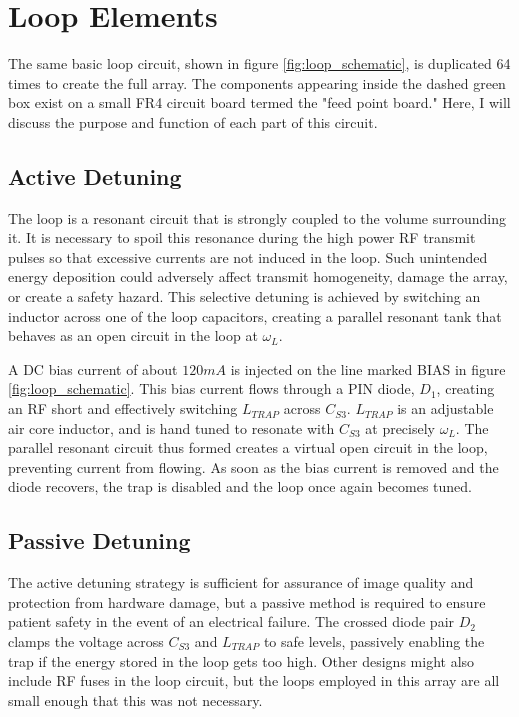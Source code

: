 \chapter{Loop Elements}

The same basic loop circuit, shown in figure \ref{fig:loop_schematic}, is duplicated 64 times to create the full array.
The components appearing inside the dashed green box exist on a small FR4 circuit board termed the "feed point board."
Here, I will discuss the purpose and function of each part of this circuit.

\section{Active Detuning}
The loop is a resonant circuit that is strongly coupled to the volume surrounding it. It is necessary to spoil this
resonance during the high power RF transmit pulses so that excessive currents are not induced in the loop. Such
unintended energy deposition could adversely affect transmit homogeneity, damage the array, or create a safety hazard.
This selective detuning is achieved by switching an inductor across one of the loop capacitors, creating a parallel
resonant tank that behaves as an open circuit in the loop at $\omega_L$.

A DC bias current of about $120mA$ is injected on the line marked BIAS in figure \ref{fig:loop_schematic}. This bias
current flows through a PIN diode, $D_1$, creating an RF short and effectively switching $L_{TRAP}$ across $C_{S3}$.
$L_{TRAP}$ is an adjustable air core inductor, and is hand tuned to resonate with $C_{S3}$ at precisely $\omega_L$. The 
parallel resonant circuit thus formed creates a virtual open circuit in the loop, preventing current from flowing. As 
soon as the bias current is removed and the diode recovers, the trap is disabled and the loop once again becomes tuned.

\section{Passive Detuning}
The active detuning strategy is sufficient for assurance of image quality and protection from hardware damage, but a
passive method is required to ensure patient safety in the event of an electrical failure. The crossed diode pair $D_2$
clamps the voltage across $C_{S3}$ and $L_{TRAP}$ to safe levels, passively enabling the trap if the energy stored in
the loop gets too high. Other designs might also include RF fuses in the loop circuit, but the loops employed in this
array are all small enough that this was not necessary.

